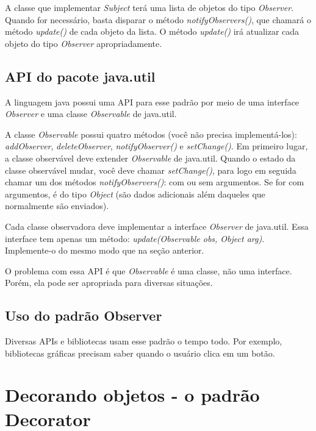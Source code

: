 \documentclass[a4paper,11pt]{report}
\begin{document}
A classe que implementar \textit{Subject} terá uma lista de objetos do tipo \textit{Observer}. Quando for necessário, basta disparar o método \textit{notifyObservers()}, que chamará o método \textit{update()} de cada objeto da lista. O método \textit{update()} irá atualizar cada objeto do tipo \textit{Observer} apropriadamente.

\section{API do pacote java.util}

A linguagem java possui uma API para esse padrão por meio de uma interface \textit{Observer} e uma classe \textit{Observable} de java.util.

A classe \textit{Observable} possui quatro métodos (você não precisa implementá-los): \textit{addObserver}, \textit{deleteObserver}, \textit{notifyObserver()} e \textit{setChange()}. Em primeiro lugar, a classe observável deve extender \textit{Observable} de java.util. Quando o estado da classe observável mudar, você deve chamar \textit{setChange()}, para logo em seguida chamar um dos métodos \textit{notifyObservers()}: com ou sem argumentos. Se for com argumentos, é do tipo \textit{Object} (são dados adicionais além daqueles que normalmente são enviados).

Cada classe observadora deve implementar a interface \textit{Observer} de java.util. Essa interface tem apenas um método: \textit{update(Observable obs, Object arg)}. Implemente-o do mesmo modo que na seção anterior.

O problema com essa API é que \textit{Observable} é uma classe, não uma interface. Porém, ela pode ser apropriada para diversas situações.

\section{Uso do padrão Observer}

Diversas APIs e bibliotecas usam esse padrão o tempo todo. Por exemplo, bibliotecas gráficas precisam saber quando o usuário clica em um botão.

\chapter{Decorando objetos - o padrão Decorator}
\end{document}
